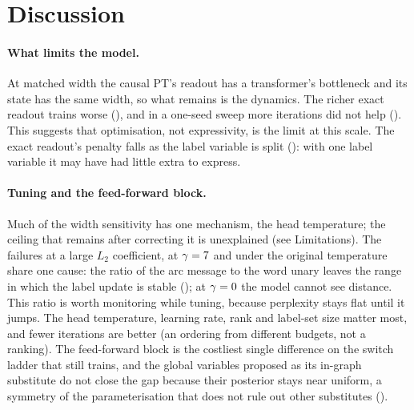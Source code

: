 \section{Discussion}
\label{sec:discussion}

\paragraph{What limits the model.}
At matched width the causal PT's readout has a transformer's bottleneck and its state has the
same width, so what remains is the dynamics. The
richer exact readout trains worse (), and in a one-seed sweep more iterations did
not help (). This suggests that optimisation, not expressivity, is the
limit at this scale. The exact readout's penalty falls as the label variable is split
(): with one label variable it may have had little extra to express.

\paragraph{Tuning and the feed-forward block.}
Much of the width sensitivity has one mechanism, the head temperature; the ceiling that remains
after correcting it is unexplained (see Limitations). The failures at a large $L_2$
coefficient, at $\gamma=7$ and under the original temperature share one cause: the ratio of the
arc message to the word unary leaves the range in which the label update is stable
(); at $\gamma=0$ the model cannot see distance. This ratio is worth
monitoring while tuning, because perplexity stays flat until it jumps. The head temperature,
learning rate, rank and label-set size matter most, and fewer iterations are better (an ordering
from different budgets, not a ranking).
The feed-forward block is the costliest single
difference on the switch ladder that still trains, and the global variables proposed as its
in-graph substitute do not close the gap because their posterior stays near uniform, a symmetry
of the parameterisation that does not rule out other substitutes ().
